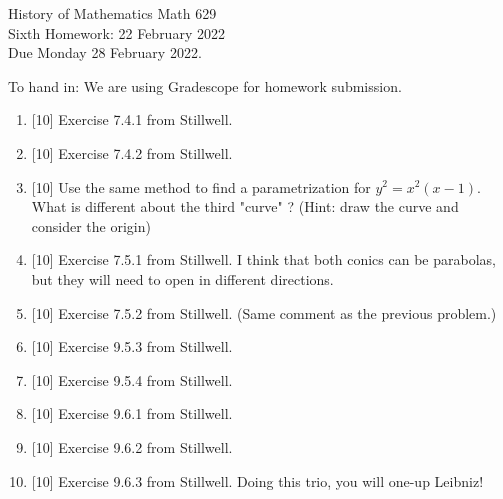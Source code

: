 \documentclass[12pt]{article}
\begin{document}
\LARGE 
\noindent
{\color{Maroon}History of Mathematics \hfill Math 629}\vspace{2pt}\\
\large
Sixth Homework: \hfill 22 February 2022\\
Due Monday 28 February 2022.
\normalsize\vspace{10pt}

To hand in: We are using Gradescope for homework submission.


\begin{enumerate}

\item  {[10]}
     Exercise 7.4.1 from Stillwell.

\item  {[10]}
     Exercise 7.4.2 from Stillwell.

\item  {[10]}
  Use the same method to find a parametrization for $y^2=x^2(x-1)$.
  What is different about the third "curve" ? (Hint: draw the curve and consider the origin) 
  

\item  {[10]}
     Exercise 7.5.1 from Stillwell.  I think that both conics can be parabolas, but they will need to open in different directions.

\item  {[10]}
     Exercise 7.5.2 from Stillwell.   (Same comment as the previous problem.)
 
\item  {[10]}
     Exercise 9.5.3 from Stillwell.

\item  {[10]}
     Exercise 9.5.4 from Stillwell.

\item  {[10]}
     Exercise 9.6.1 from Stillwell.

\item  {[10]}
     Exercise 9.6.2 from Stillwell.

\item  {[10]}
     Exercise 9.6.3 from Stillwell.  Doing this trio, you will one-up Leibniz!


     


\end{enumerate}
\end{document}
